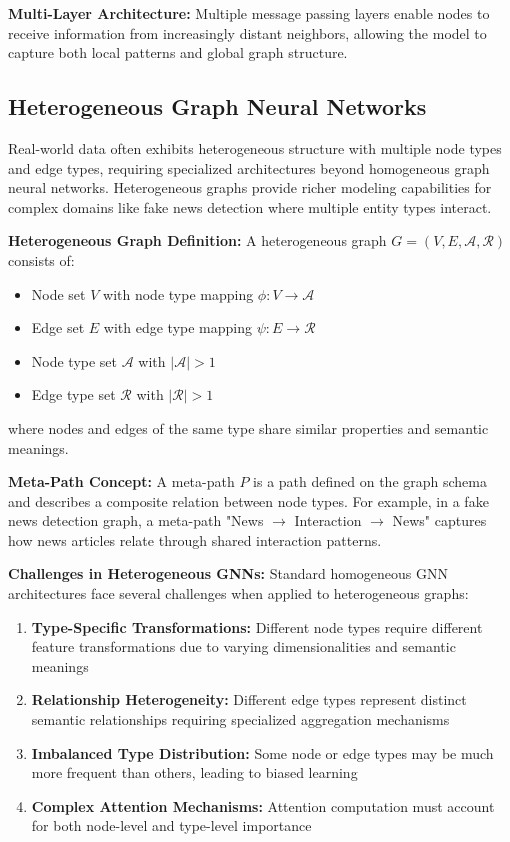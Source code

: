 \textbf{Multi-Layer Architecture:} Multiple message passing layers enable nodes to receive information from increasingly distant neighbors, allowing the model to capture both local patterns and global graph structure.

\subsection{Heterogeneous Graph Neural Networks}

Real-world data often exhibits heterogeneous structure with multiple node types and edge types, requiring specialized architectures beyond homogeneous graph neural networks. Heterogeneous graphs provide richer modeling capabilities for complex domains like fake news detection where multiple entity types interact.

\textbf{Heterogeneous Graph Definition:} A heterogeneous graph $G = (V, E, \mathcal{A}, \mathcal{R})$ consists of:
\begin{itemize}
\item Node set $V$ with node type mapping $\phi: V \rightarrow \mathcal{A}$
\item Edge set $E$ with edge type mapping $\psi: E \rightarrow \mathcal{R}$  
\item Node type set $\mathcal{A}$ with $|\mathcal{A}| > 1$
\item Edge type set $\mathcal{R}$ with $|\mathcal{R}| > 1$
\end{itemize}

where nodes and edges of the same type share similar properties and semantic meanings.

\textbf{Meta-Path Concept:} A meta-path $P$ is a path defined on the graph schema and describes a composite relation between node types. For example, in a fake news detection graph, a meta-path "News $\rightarrow$ Interaction $\rightarrow$ News" captures how news articles relate through shared interaction patterns.


\textbf{Challenges in Heterogeneous GNNs:} Standard homogeneous GNN architectures face several challenges when applied to heterogeneous graphs:
\begin{enumerate}
\item \textbf{Type-Specific Transformations:} Different node types require different feature transformations due to varying dimensionalities and semantic meanings
\item \textbf{Relationship Heterogeneity:} Different edge types represent distinct semantic relationships requiring specialized aggregation mechanisms
\item \textbf{Imbalanced Type Distribution:} Some node or edge types may be much more frequent than others, leading to biased learning
\item \textbf{Complex Attention Mechanisms:} Attention computation must account for both node-level and type-level importance
\end{enumerate}


